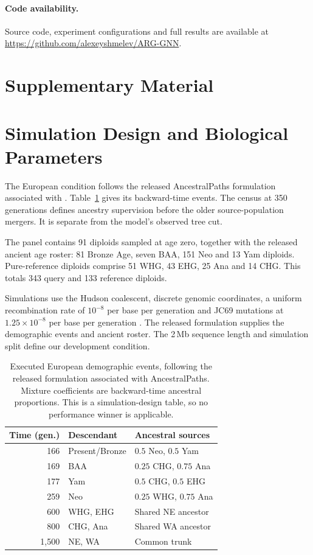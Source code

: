 \documentclass[letterpaper]{article}
\begin{document}
\paragraph{Code availability.}
Source code, experiment configurations and full results are available at \url{https://github.com/alexeyshmelev/ARG-GNN}.



\clearpage
\appendix
\section*{Supplementary Material}
\suppressfloats[t]
\section{Simulation Design and Biological Parameters}
\label{app:simulation}
The European condition follows the released AncestralPaths formulation associated with \citet{eurasians2024}. Table~\ref{tab:demography} gives its backward-time events. The census at 350 generations defines ancestry supervision before the older source-population mergers. It is separate from the model's observed tree cut.

The panel contains 91 diploids sampled at age zero, together with the released ancient age roster: 81 Bronze Age, seven BAA, 151 Neo and 13 Yam diploids. Pure-reference diploids comprise 51 WHG, 43 EHG, 25 Ana and 14 CHG. This totals 343 query and 133 reference diploids.

Simulations use the Hudson coalescent, discrete genomic coordinates, a uniform recombination rate of $10^{-8}$ per base per generation and JC69 mutations at $1.25\times10^{-8}$ per base per generation \citep{msprime2022}. The released formulation supplies the demographic events and ancient roster. The 2\,Mb sequence length and simulation split define our development condition.

\begin{table}[htbp]
\centering
\small
\begin{tabular}{@{}rll@{}}
\toprule
Time (gen.) & Descendant & Ancestral sources\\
\midrule
166 & Present/Bronze & $0.5$ Neo, $0.5$ Yam\\
169 & BAA & $0.25$ CHG, $0.75$ Ana\\
177 & Yam & $0.5$ CHG, $0.5$ EHG\\
259 & Neo & $0.25$ WHG, $0.75$ Ana\\
600 & WHG, EHG & Shared NE ancestor\\
800 & CHG, Ana & Shared WA ancestor\\
1,500 & NE, WA & Common trunk\\
\bottomrule
\end{tabular}
\caption{Executed European demographic events, following the released formulation associated with AncestralPaths. Mixture coefficients are backward-time ancestral proportions. This is a simulation-design table, so no performance winner is applicable.}
\label{tab:demography}
\end{table}
\end{document}

